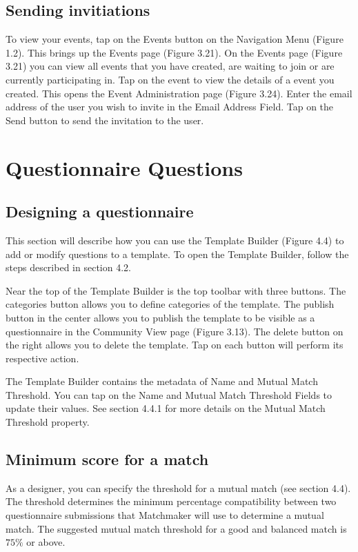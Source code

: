 \documentclass[a4paper,11pt,titlepage]{scrartcl}
\begin{document}
\subsection{Sending invitiations}
\label{sec:questionnaire-invite}
To view your events, tap on the Events button on the Navigation Menu (Figure 1.2). This brings up the Events page (Figure 3.21).   On the Events page (Figure 3.21) you can view all events that you have created, are waiting to join or are currently participating in.  Tap on the event to view the details of a event you created.  This opens the Event Administration page (Figure 3.24).   Enter the email address of the user you wish to invite in the Email Address Field.  Tap on the Send button to send the invitation to the user.

\clearpage
\section{Questionnaire Questions}
\label{sec:qquestions}

\subsection{Designing a questionnaire}
\label{sec:dquestions}

This section will describe how you can use the Template Builder (Figure 4.4) to add or modify questions to a template. To open the Template Builder, follow the steps described in section 4.2. 

Near the top of the Template Builder is the top toolbar with three buttons. The categories button    allows you to define categories of the template. The publish button   in the center allows you to publish the template to be visible as a questionnaire in the Community View page (Figure 3.13). The delete button   on the right allows you to delete the template.  Tap on each button will perform its respective action. 

The Template Builder contains the metadata of Name and Mutual Match Threshold. You can tap on the Name and Mutual Match Threshold Fields to update their values.  See section 4.4.1 for more details on the Mutual Match Threshold property.

\subsection{Minimum score for a match}
\label{sec:minscore}
As a designer, you can specify the threshold for a mutual match (see section 4.4). The threshold determines the minimum percentage compatibility between two questionnaire submissions that Matchmaker will use to determine a mutual match.  The suggested mutual match threshold for a good and balanced match is $75\%$ or above.
\end{document}
